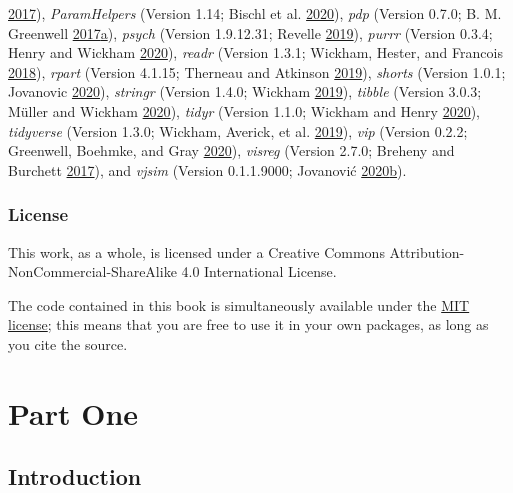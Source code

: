 \documentclass[
]{book}
\begin{document}
\protect\hyperlink{ref-R-openml}{2017}), \emph{ParamHelpers} (Version 1.14; Bischl et al. \protect\hyperlink{ref-R-ParamHelpers}{2020}), \emph{pdp} (Version 0.7.0; B. M. Greenwell \protect\hyperlink{ref-R-pdp}{2017}\protect\hyperlink{ref-R-pdp}{a}), \emph{psych} (Version 1.9.12.31; Revelle \protect\hyperlink{ref-R-psych}{2019}), \emph{purrr} (Version 0.3.4; Henry and Wickham \protect\hyperlink{ref-R-purrr}{2020}), \emph{readr} (Version 1.3.1; Wickham, Hester, and Francois \protect\hyperlink{ref-R-readr}{2018}), \emph{rpart} (Version 4.1.15; Therneau and Atkinson \protect\hyperlink{ref-R-rpart}{2019}), \emph{shorts} (Version 1.0.1; Jovanovic \protect\hyperlink{ref-R-shorts}{2020}), \emph{stringr} (Version 1.4.0; Wickham \protect\hyperlink{ref-R-stringr}{2019}), \emph{tibble} (Version 3.0.3; Müller and Wickham \protect\hyperlink{ref-R-tibble}{2020}), \emph{tidyr} (Version 1.1.0; Wickham and Henry \protect\hyperlink{ref-R-tidyr}{2020}), \emph{tidyverse} (Version 1.3.0; Wickham, Averick, et al. \protect\hyperlink{ref-R-tidyverse}{2019}), \emph{vip} (Version 0.2.2; Greenwell, Boehmke, and Gray \protect\hyperlink{ref-R-vip}{2020}), \emph{visreg} (Version 2.7.0; Breheny and Burchett \protect\hyperlink{ref-R-visreg}{2017}), and \emph{vjsim} (Version 0.1.1.9000; Jovanović \protect\hyperlink{ref-R-vjsim}{2020}\protect\hyperlink{ref-R-vjsim}{b}).

\hypertarget{license}{%
\section*{License}\label{license}}

This work, as a whole, is licensed under a Creative Commons Attribution-NonCommercial-ShareAlike 4.0 International License.

The code contained in this book is simultaneously available under the \href{https://opensource.org/licenses/MIT}{MIT license}; this means that you are free to use it in your own packages, as long as you cite the source.

\hypertarget{part-part-one}{%
\part{Part One}\label{part-part-one}}

\hypertarget{introduction}{%
\chapter{Introduction}\label{introduction}}
\end{document}
